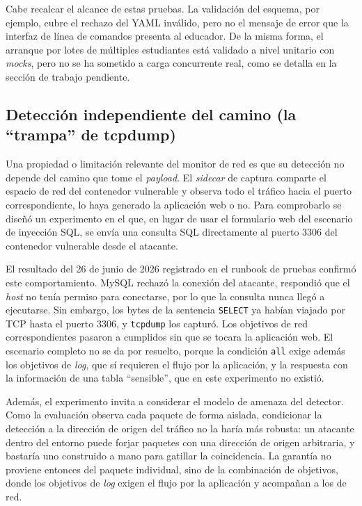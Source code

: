 Cabe recalcar el alcance de estas pruebas. La validación del esquema, por
ejemplo, cubre el rechazo del YAML inválido, pero no el mensaje de error que la
interfaz de línea de comandos presenta al educador. De la misma forma, el
arranque por lotes de múltiples estudiantes está validado a nivel unitario con
\textit{mocks}, pero no se ha sometido a carga concurrente real, como se detalla
en la sección de
trabajo pendiente.

\subsection{Detección independiente del camino (la ``trampa'' de tcpdump)}
\label{sec:trampa-tcpdump}

Una propiedad o limitación relevante del monitor de red es que su detección no
depende del camino que tome el \textit{payload}. El \textit{sidecar} de captura
comparte el
espacio de red del contenedor vulnerable y observa todo el tráfico hacia el
puerto correspondiente, lo haya generado la aplicación web o no. Para
comprobarlo se diseñó un experimento en el que, en lugar de usar el formulario
web del escenario de inyección SQL, se envía una consulta SQL directamente al
puerto 3306 del contenedor vulnerable desde el atacante.

El resultado del 26 de junio de 2026 registrado en el runbook de
pruebas confirmó este comportamiento. MySQL rechazó
la conexión del atacante, respondió que el \textit{host} no tenía permiso para
conectarse, por lo que la consulta nunca llegó a ejecutarse. Sin embargo, los
bytes de la sentencia \texttt{SELECT} ya habían viajado por TCP hasta el puerto
3306, y \texttt{tcpdump} los capturó. Los objetivos de red correspondientes
pasaron a
cumplidos sin que se tocara la aplicación web.
El escenario completo no se da por
resuelto, porque la condición \texttt{all} exige además los objetivos de
\textit{log}, que sí requieren el flujo por la aplicación, y la respuesta con la
información de una tabla ``sensible'', que en este experimento no existió.

Además, el experimento invita a considerar el modelo de amenaza del detector.
Como la evaluación observa cada paquete de forma aislada, condicionar la
detección a la dirección de origen del tráfico no la haría más robusta: un
atacante dentro del entorno puede forjar paquetes con una dirección de origen
arbitraria, y bastaría uno construido a mano para gatillar la coincidencia. La
garantía no proviene entonces del paquete individual, sino de la combinación
de objetivos, donde los objetivos de \textit{log} exigen el flujo por la 
aplicación y acompañan a los de red.


